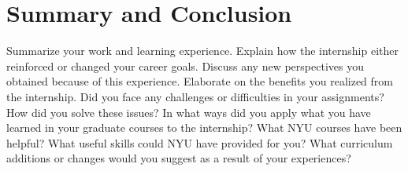 \documentclass[12pt]{report}
\begin{document}
\section*{Summary and Conclusion}
Summarize your work and learning experience. Explain how the internship either reinforced or changed your career goals. Discuss any new perspectives you obtained because of this experience. Elaborate on the benefits you realized from the internship. Did you face any challenges or difficulties in your assignments? How did you solve these issues? In what ways did you apply what you have learned in your graduate courses to the internship? What NYU courses have been helpful? What useful skills could NYU have provided for you? What curriculum additions or changes would you suggest as a result of your experiences?
\end{document}
